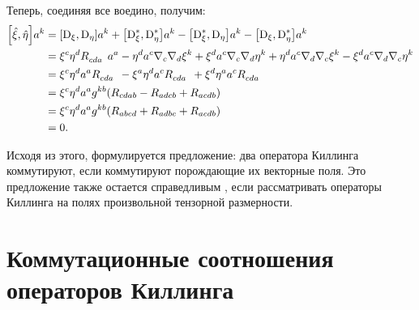 \documentclass[12pt,a4paper]{article}
\begin{document}
            Теперь, соединяя все воедино, получим:
            \begin{equation}\begin{aligned}
                \comm{\Op{\xi}}{\Op{\eta}} a^k
                    &= \comm{\D_\xi}{\D_\eta} a^k
                     + \comm{\D^{*}_\xi}{\D^{*}_\eta} a^k
                     - \comm{\D^{*}_\xi}{\D_\eta} a^k
                     - \comm{\D_\xi}{\D^{*}_\eta} a^k \\
                    &= \xi^c \eta^d R_{cda}^{\hphantom{cdak}} a^a
                     - \eta^d a^c \nabla_c \nabla_d \xi^k
                     + \xi^d a^c \nabla_c \nabla_d \eta^k
                     + \eta^d a^c \nabla_d \nabla_c \xi^k
                     - \xi^d a^c \nabla_d \nabla_c \eta^k \\
                    &= \xi^c \eta^d a^a R_{cda}^{\hphantom{cdak}}
                     - \xi^a \eta^d a^c R_{cda}^{\hphantom{cdak}}
                     + \xi^d \eta^a a^c R_{cda}^{\hphantom{cdak}} \\
                    &= \xi^c \eta^d a^a g^{kb} \qty(
                        R_{cdab} - R_{adcb} + R_{acdb}
                    ) \\
                    &= \xi^c \eta^d a^a g^{kb} \qty(
                        R_{abcd} + R_{adbc} + R_{acdb}
                    ) \\
                    &= 0 .
            \end{aligned}\end{equation}

            Исходя из этого, формулируется предложение: два оператора Киллинга коммутируют, если коммутируют порождающие их векторные поля. Это предложение также остается справедливым \cite{burlankov_space_dynamics}, если рассматривать операторы Киллинга на полях произвольной тензорной размерности.


    \section{Коммутационные соотношения операторов Киллинга}
\end{document}
